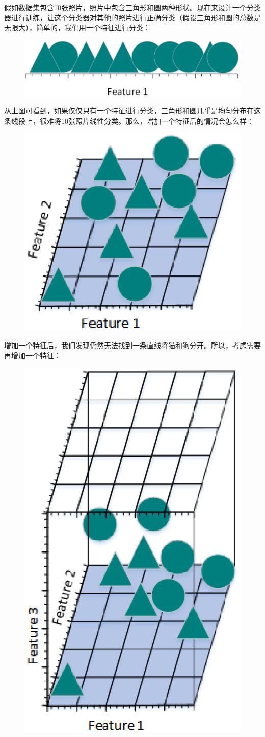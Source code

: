 假如数据集包含10张照片，照片中包含三角形和圆两种形状。现在来设计一个分类器进行训练，让这个分类器对其他的照片进行正确分类（假设三角形和圆的总数是无限大），简单的，我们用一个特征进行分类：

 \begin{figure}[h]
   \centering
   \includegraphics[width=.7\textwidth]{imgs/2.21.1.1.eps}
 \end{figure} %

从上图可看到，如果仅仅只有一个特征进行分类，三角形和圆几乎是均匀分布在这条线段上，很难将10张照片线性分类。那么，增加一个特征后的情况会怎么样：

 \begin{figure}[h]
   \centering
   \includegraphics[width=.5\textwidth]{imgs/2.21.1.2.eps}
 \end{figure}

增加一个特征后，我们发现仍然无法找到一条直线将猫和狗分开。所以，考虑需要再增加一个特征：

 \begin{figure}[h]
   \centering
   \includegraphics[width=.3\textwidth]{imgs/2.21.1.3.eps}
 \end{figure}


